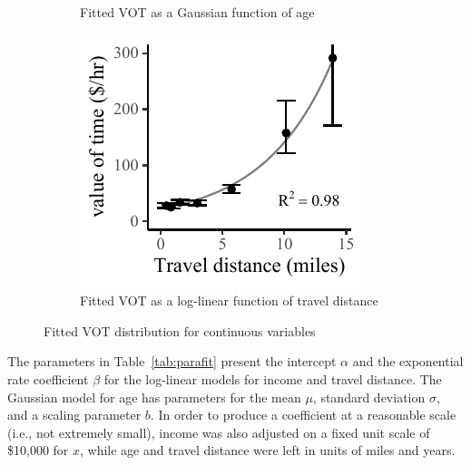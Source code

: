 \documentclass[numbered]{trbunofficial}\usepackage[]{graphicx}\usepackage[]{color}
\makeatletter
\def\maxwidth{ %
  \ifdim\Gin@nat@width>\linewidth
    \linewidth
  \else
    \Gin@nat@width
  \fi
}
\newenvironment{knitrout}{}{} %
\makeatother
\begin{document}
\begin{figure}[H]
\begin{subfigure}[b]{0.32\textwidth}
\begin{knitrout}
\end{knitrout}
    \caption{\centering Fitted VOT as a Gaussian function of age}
	  \label{fig:agefit}
  \end{subfigure}
  \begin{subfigure}[b]{0.32\textwidth}
\begin{knitrout}
\color{fgcolor}
\includegraphics[width=\maxwidth]{figure/plot_distfit-1} 

\end{knitrout}
    \caption{\centering Fitted VOT as a log-linear function of travel distance}
	  \label{fig:distfit}
  \end{subfigure}
	\caption{Fitted VOT distribution for continuous variables}
	\label{fig:fits}
\end{figure}

The parameters in Table~\ref{tab:parafit} present the intercept $\alpha$ and the exponential rate coefficient $\beta$ for the log-linear models for income and travel distance. The Gaussian model for age has parameters for the mean $\mu$, standard deviation $\sigma$, and a scaling parameter $b$. In order to produce a coefficient at a reasonable scale (i.e., not extremely small), income was also adjusted on a fixed unit scale of \$10,000 for $x$, while age and travel distance were left in units of miles and years.
\end{document}
